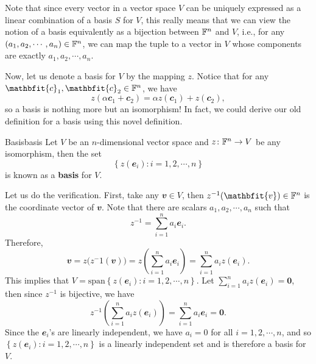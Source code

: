 \documentclass[math]{amznotes}
\theoremstyle{remark}
\newcommand{\zero}{\mathbf{0}}
\begin{document}
Note that since every vector in a vector space $V$ can be uniquely expressed as a linear combination of a basis $S$ for $V$, this really means that we can view the notion of a basis equivalently as a bijection between $\mathbb{F}^n$ and $V$, i.e., for any $(a_1, a_2, \cdots, a_n) \in \mathbb{F}^n$, we can map the tuple to a vector in $V$ whose components are exactly $a_1, a_2, \cdots, a_n$.

Now, let us denote a basis for $V$ by the mapping $z$. Notice that for any $\mathbfit{c}_1, \mathbfit{c}_2 \in \F^n$, we have 
\begin{equation*}
    z(\alpha\mathbfit{c}_1 + \mathbfit{c}_2) = \alpha z(\mathbfit{c}_1) + z(\mathbfit{c}_2),
\end{equation*}
so a basis is nothing more but an isomorphism! In fact, we could derive our old definition for a basis using this novel definition.
\begin{dfnbox}{Basis}{basis}
    Let $V$ be an $n$-dimensional vector space and $z \colon \mathbb{F}^n \to V$ be any isomorphism, then the set 
    \begin{equation*}
        \left\{z\left(\mathbfit{e}_i\right) \colon i = 1, 2, \cdots, n\right\}
    \end{equation*}
    is known as a {\color{red} \textbf{basis}} for $V$.
\end{dfnbox}
Let us do the verification. First, take any $\mathbfit{v} \in V$, then $z^{-1}(\mathbfit{v}) \in \F^n$ is the coordinate vector of $\mathbfit{v}$. Note that there are scalars $a_1, a_2, \cdots, a_n$ such that 
\begin{equation*}
    z^{-1} = \sum_{i = 1}^{n}a_i\mathbfit{e}_i.
\end{equation*}
Therefore,
\begin{equation*}
    \mathbfit{v} = z\bigl(z^-1(\mathbfit{v})\bigr) = z\left(\sum_{i = 1}^{n}a_i\mathbfit{e}_i\right) = \sum_{i = 1}^{n}a_iz(\mathbfit{e}_i).
\end{equation*}
This implies that $V = \mathrm{span}\left\{z\left(\mathbfit{e}_i\right) \colon i = 1, 2, \cdots, n\right\}$. Let $\sum_{i = 1}^{n}a_iz(\mathbfit{e}_i) = \zero$, then since $z^{-1}$ is bijective, we have 
\begin{equation*}
    z^{-1}\left(\sum_{i = 1}^{n}a_iz(\mathbfit{e}_i)\right) = \sum_{i = 1}^{n}a_i\mathbfit{e}_i = \zero.
\end{equation*}
Since the $\mathbfit{e}_i$'s are linearly independent, we have $a_i = 0$ for all $i = 1, 2, \cdots, n$, and so $\left\{z\left(\mathbfit{e}_i\right) \colon i = 1, 2, \cdots, n\right\}$ is a linearly independent set and is therefore a basis for $V$.
\end{document}
